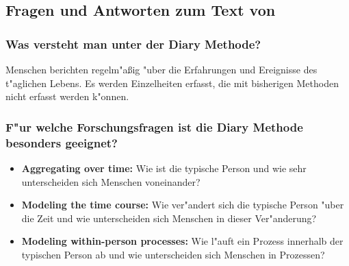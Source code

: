 \subsection{Fragen und Antworten zum Text von \textcite{bolger_diary_2003}}
\subsubsection{Was versteht man unter der Diary Methode?}
Menschen berichten regelm"aßig "uber die Erfahrungen und Ereignisse des t"aglichen Lebens. Es werden Einzelheiten erfasst, die mit bisherigen Methoden nicht erfasst werden k"onnen. 

\subsubsection{F"ur welche Forschungsfragen ist die Diary Methode besonders geeignet?}
\begin{itemize}
        \item \textbf{Aggregating over time:} Wie ist die typische Person und wie sehr unterscheiden sich Menschen voneinander?
        \item \textbf{Modeling the time course:} Wie ver"andert sich die typische Person "uber die Zeit und wie unterscheiden sich Menschen in dieser Ver"anderung?
        \item \textbf{Modeling within-person processes:} Wie l"auft ein Prozess innerhalb der typischen Person ab und wie unterscheiden sich Menschen in Prozessen?
\end{itemize}

